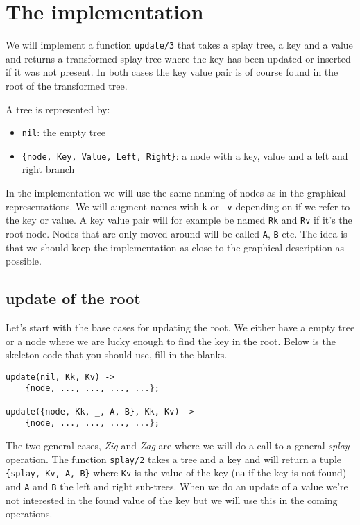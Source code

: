\documentclass[a4paper,11pt]{article}
\begin{document}
\section{The implementation}

We will implement a function {\tt update/3} that takes a splay tree, a
key and a value and returns a transformed splay tree where the key has
been updated or inserted if it was not present. In both cases the key
value pair is of course found in the root of the transformed tree.

A tree is represented by:

\begin{itemize}
  \item {\tt nil}:  the empty tree
  \item {\tt \{node, Key, Value, Left, Right\}}:  a node with a key, value and a left and right branch
\end{itemize}

In the implementation we will use the same naming of nodes as in the
graphical representations. We will augment names with {\tt k} or {\tt
  v} depending on if we refer to the key or value. A key value pair
will for example be named {\tt Rk} and {\tt Rv} if it's the root
node. Nodes that are only moved around will be called {\tt A}, {\tt B}
etc.  The idea is that we should keep the implementation as close to
the graphical description as possible.


\subsection{update of the root}

Let's start with the base cases for updating the root. We either have
a empty tree or a node where we are lucky enough to find the key in
the root. Below is the skeleton code that you should use, fill in the
blanks.

\begin{lstlisting}
update(nil, Kk, Kv) ->
    {node, ..., ..., ..., ...};

update({node, Kk, _, A, B}, Kk, Kv) ->
    {node, ..., ..., ..., ...};
\end{lstlisting}

The two general cases, {\em Zig} and  {\em Zag} are where we will do a
call to  a general {\em  splay} operation. The function  {\tt splay/2}
takes a  tree and a key  and will return  a tuple {\tt \{splay,  Kv, A,
  B\}} where {\tt Kv}  is the value of the key ({\tt na}  if the key is
not found) and {\tt A} and {\tt  B} the left and right sub-trees. When
we do an update of a value  we're not interested in the found value of
the key but we will use this in the coming operations.
\end{document}
